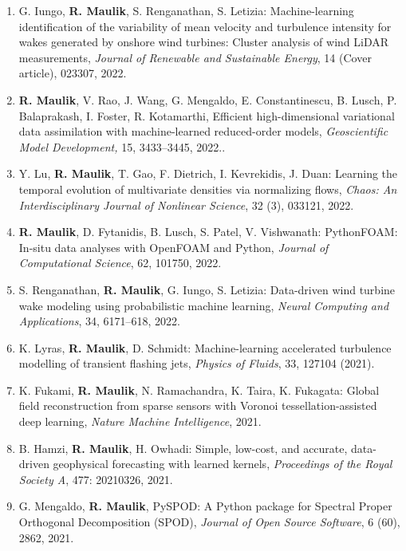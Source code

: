 \documentclass[letterpaper]{article}
\begin{document}
\begin{enumerate}
\item G. Iungo, \textbf{R. Maulik}, S. Renganathan, S. Letizia: Machine-learning identification of the variability of mean velocity and turbulence intensity for wakes generated by onshore wind turbines: Cluster analysis of wind LiDAR measurements, {\it Journal of Renewable and Sustainable Energy}, 14 (Cover article), 023307, 2022.

\item \textbf{R. Maulik}, V. Rao, J. Wang, G. Mengaldo, E. Constantinescu, B. Lusch, P. Balaprakash, I. Foster, R. Kotamarthi, Efficient high-dimensional variational data assimilation with machine-learned reduced-order models, {\it Geoscientific Model Development,} 15, 3433–3445, 2022..

\item Y. Lu, \textbf{R. Maulik}, T. Gao, F. Dietrich, I. Kevrekidis, J. Duan: Learning the temporal evolution of multivariate densities via normalizing flows, {\it Chaos: An Interdisciplinary Journal of Nonlinear Science}, 32 (3), 033121, 2022.

\item \textbf{R. Maulik}, D. Fytanidis, B. Lusch, S. Patel, V. Vishwanath: PythonFOAM: In-situ data analyses with OpenFOAM and Python, {\it Journal of Computational Science}, 62, 101750, 2022.

\item S. Renganathan, \textbf{R. Maulik}, G. Iungo, S. Letizia: Data-driven wind turbine wake modeling using probabilistic machine learning, {\it Neural Computing and Applications}, 34, 6171–618, 2022.

\item K. Lyras, \textbf{R. Maulik}, D. Schmidt: Machine-learning accelerated turbulence modelling of transient flashing jets, {\it Physics of Fluids}, 33, 127104 (2021).

\item K. Fukami, \textbf{R. Maulik}, N. Ramachandra, K. Taira, K. Fukagata: Global field reconstruction from sparse sensors with Voronoi tessellation-assisted deep learning, {\it Nature Machine Intelligence}, 2021.

\item B. Hamzi, \textbf{R. Maulik}, H. Owhadi: Simple, low-cost, and accurate, data-driven geophysical forecasting with learned kernels, {\it Proceedings of the Royal Society A}, 477: 20210326, 2021.

\item G. Mengaldo, \textbf{R. Maulik}, PySPOD: A Python package for Spectral Proper Orthogonal Decomposition (SPOD), {\it Journal of Open Source Software}, 6 (60), 2862, 2021.


\end{enumerate}
\end{document}
